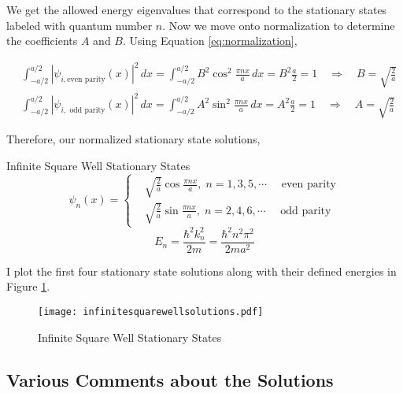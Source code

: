 We get the allowed energy eigenvalues that correspond to the stationary states
labeled with quantum number $n$. Now we move onto normalization to determine
the coefficients $A$ and $B$. Using Equation \ref{eq:normalization}, 

\begin{align} \label{}
  &\int_{-a/2}^{a/2} |\psi_{i, \text{even parity}} (x)|^2 \, dx = \int_{-a/2}^{a/2} B^2 \cos^2
  \frac{\pi n x}{a} \, dx = B^2 \frac{a}{2} = 1 \quad \Rightarrow \quad
  B = \sqrt{\frac{2}{a}} \\ 
  &\int_{-a/2}^{a/2} |\psi_{i, \text{ odd parity}} (x) |^2  \, dx
  = \int_{-a/2}^{a/2} A^2 \sin^2 \frac{\pi n x}{a} \, dx = A^2 \frac{a}{2}
  = 1 \quad \Rightarrow \quad A = \sqrt{\frac{2}{a}}
\end{align}\vspace{3px}

Therefore, our normalized stationary state solutions, \\

\begin{mainbox}{Infinite Square Well Stationary States}
  \[ \psi_n(x) = \begin{cases}
    & \sqrt{\frac{2}{a}}\cos \frac{\pi n x}{a}, \; n = 1,3,5, \cdots \quad
    \text{ even parity} \\ & \sqrt{\frac{2}{a}} \sin \frac{\pi n x}{a}, \;
    n = 2, 4, 6, \cdots \quad \text{ odd parity} 
  \end{cases}  \] \[ E_n = \frac{\hbar^2 k_n^2}{2m} = \frac{\hbar^2 n^2
\pi^2}{2ma^2} \]
\end{mainbox} \vspace{5px}

I plot the first four stationary state solutions along with their defined energies
in Figure \ref{fig:infsquarewell}.
\begin{figure}[!ht]
  \centering
    \texttt{[image: infinitesquarewellsolutions.pdf]}
    \caption{Infinite Square Well Stationary States}
    \label{fig:infsquarewell}
\end{figure}
\subsection{Various Comments about the Solutions}

